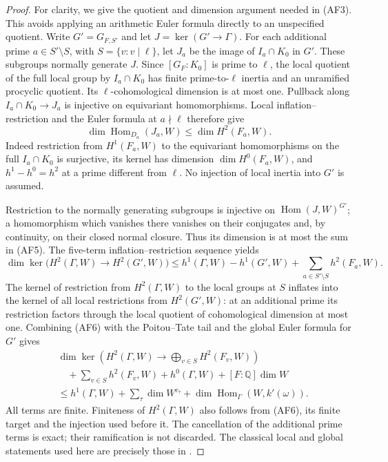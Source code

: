 \begin{proof}
For clarity, we give the quotient and dimension argument
needed in (AF3).  This avoids applying an arithmetic
Euler formula directly to an unspecified quotient.
Write $G'=G_{F,S'}$ and let $J=\ker(G'\to\Gamma)$.
For each additional prime $a\in S'\setminus S$, with
$S=\{v:v\mid\ell\}$, let $J_a$ be the image of
$I_a\cap K_0$ in $G'$.  These subgroups normally generate
$J$.  Since $[G_F:K_0]$ is prime to $\ell$, the local
quotient of the full local group by $I_a\cap K_0$ has
finite prime-to-$\ell$ inertia and an unramified procyclic
quotient.  Its $\ell$-cohomological dimension is at most
one.  Pullback along $I_a\cap K_0\to J_a$ is injective
on equivariant homomorphisms.  Local inflation--restriction
and the Euler formula at $a\nmid\ell$ therefore give
\[
 \dim\operatorname{Hom}_{D_a}(J_a,W)
             \leq\dim H^2(F_a,W).                        \tag{AF5}
\]
Indeed restriction from $H^1(F_a,W)$ to the equivariant
homomorphisms on the full $I_a\cap K_0$ is surjective,
its kernel has dimension $\dim H^0(F_a,W)$, and
$h^1-h^0=h^2$ at a prime different from $\ell$.
No injection of local inertia into $G'$ is assumed.

Restriction to the normally generating subgroups is
injective on $\operatorname{Hom}(J,W)^{G'}$; a homomorphism
which vanishes there vanishes on their conjugates and,
by continuity, on their closed normal closure.  Thus its
dimension is at most the sum in (AF5).  The five-term
inflation--restriction sequence yields
\[
 \dim\ker\bigl(H^2(\Gamma,W)\to H^2(G',W)\bigr)
 \leq h^1(\Gamma,W)-h^1(G',W)
             +\sum_{a\in S'\setminus S}h^2(F_a,W).       \tag{AF6}
\]
The kernel of restriction from $H^2(\Gamma,W)$ to the
local groups at $S$ inflates into the kernel of all
local restrictions from $H^2(G',W)$: at an additional
prime its restriction factors through the local quotient
of cohomological dimension at most one.  Combining (AF6)
with the Poitou--Tate tail and the global Euler formula
for $G'$ gives
\[
 \begin{aligned}
 &\dim\ker\!\left(H^2(\Gamma,W)\to
                   \bigoplus_{v\in S}H^2(F_v,W)\right)\\
 &\quad+\sum_{v\in S}h^2(F_v,W)+h^0(\Gamma,W)
       +[F:\mathbb Q]\dim W\\
 &\leq h^1(\Gamma,W)+\sum_\tau\dim W^{c_\tau}
       +\dim\operatorname{Hom}_{\Gamma}(W,k'(\omega)).
 \end{aligned}                                           \tag{AF7}
\]
All terms are finite.  Finiteness of $H^2(\Gamma,W)$ also
follows from (AF6), its finite target and the injection
used before it.  The cancellation of the additional
prime terms is exact; their ramification is not discarded.
The classical local and global statements used here are
precisely those in \cite{AuxTowerDuality}.


\end{proof}
